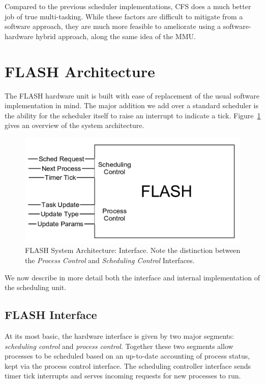 \documentclass{sig-alternate-10pt}
\begin{document}
Compared to the previous scheduler implementations, CFS does a much better job of true multi-tasking. While these factors are difficult to mitigate from a software approach, they are much more feasible to ameliorate using a software-hardware hybrid approach, along the same idea of the MMU.

\section{FLASH Architecture}
The FLASH hardware unit is built with ease of replacement of the usual
software implementation in mind.  The major addition we add over a standard
scheduler is the ability for the scheduler itself to raise an interrupt to
indicate a tick. Figure~\ref{fig:arch_overview} gives an overview of the
system architecture.

\begin{figure}
	\begin{center}
		\includegraphics[width=0.9\linewidth]{fig/flash-diagram.png}
		\caption{
			FLASH System Architecture: Interface.  Note the distinction between
			the \emph{Process Control} and \emph{Scheduling Control} Interfaces.
		}
		\label{fig:arch_overview}
	\end{center}
\end{figure}

We now describe in more detail both the interface and
internal implementation of the scheduling unit.

\subsection{FLASH Interface}
At its most basic, the hardware interface is given by two major segments:
\emph{scheduling control} and \emph{process control}.  Together these two
segments allow processes to be scheduled based on an up-to-date accounting
of process status, kept via the process control interface.  The scheduling
controller interface sends timer tick interrupts and serves incoming
requests for new processes to run.
\end{document}
